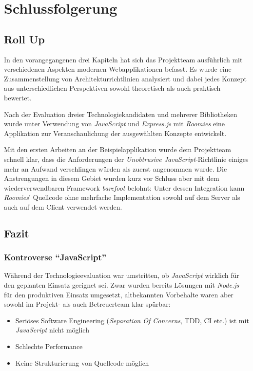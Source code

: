 \chapter{Schlussfolgerung}

\section*{Roll Up}
In den vorangegangenen drei Kapiteln hat sich das Projektteam ausführlich mit verschiedenen Aspekten modernen Webapplikationen befasst. Es wurde eine Zusammenstellung von Architekturrichtlinien analysiert und dabei jedes Konzept aus unterschiedlichen Perspektiven sowohl theoretisch als auch praktisch bewertet.

Nach der Evaluation dreier Technologiekandidaten und mehrerer Bibliotheken wurde unter Verwendung von \emph{JavaScript} und \emph{Express.js} mit \emph{Roomies} eine Applikation zur Veranschaulichung der ausgewählten Konzepte entwickelt.

Mit den ersten Arbeiten an der Beispielapplikation wurde dem Projektteam schnell klar, dass die Anforderungen der \emph{Unobtrusive JavaScript}-Richtlinie einiges mehr an Aufwand verschlingen würden als zuerst angenommen wurde. Die Anstrengungen in diesem Gebiet wurden kurz vor Schluss aber mit dem wiederverwendbaren Framework \emph{barefoot} belohnt: Unter dessen Integration kann \emph{Roomies}' Quellcode ohne mehrfache Implementation sowohl auf dem Server als auch auf dem Client verwendet werden.


\section*{Fazit}
\subsection*{Kontroverse ``JavaScript''}
Während der Technologieevaluation war umstritten, ob \emph{JavaScript} wirklich für den geplanten Einsatz geeignet sei. Zwar wurden bereits Lösungen mit \emph{Node.js} für den produktiven Einsatz umgesetzt, altbekannten Vorbehalte waren aber sowohl im Projekt- als auch Betreuerteam klar spürbar:

\begin{itemize}
	\item Seriöses Software Engineering (\emph{Separation Of Concerns}, \gls{TDD}, CI etc.) ist mit \emph{JavaScript} nicht möglich
	\item Schlechte Performance
	\item Keine Strukturierung von Quellcode möglich
\end{itemize}

